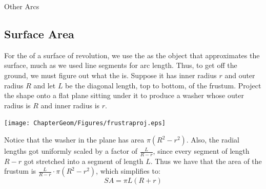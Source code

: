 \begin{exercise}{Other Arcs \Coffeecup \Coffeecup \Coffeecup}
\begin{itemize}

\end{itemize}

\end{exercise}

\subsection{Surface Area}

For the  of a surface of revolution, we use the  as the object that approximates the surface, much as we used line segments for arc length.  Thus, to get off the ground, we must figure out what the  is.  Suppose it has inner radius $r$ and outer radius $R$ and let $L$ be the diagonal length, top to bottom, of the frustum.  Project the shape onto a flat plane sitting under it to produce a washer whose outer radius is $R$ and inner radius is $r$.

	\begin{center}
		\texttt{[image: ChapterGeom/Figures/frustraproj.eps]}
	\end{center} 

Notice that the washer in the plane has area $\pi (R^2-r^2)$.  Also, the radial lengths got uniformly scaled by a factor of $\frac{L}{R-r}$, since every segment of length $R-r$ got stretched into a segment of length $L$.  Thus we have that the area of the frustum is $\frac{L}{R-r}\cdot \pi (R^2-r^2)$, which simplifies to: $$SA=\pi L (R+r) $$

